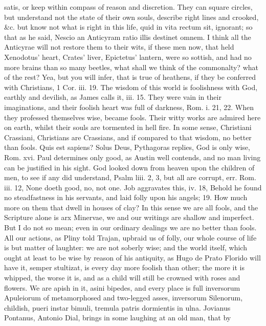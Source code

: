{satis, or keep within compass of reason and discretion. They can square
circles, but understand not the state of their own souls, describe
right lines and crooked, \&c. but know not what is right in this life,
quid in vita rectum sit, ignorant; so that as he said, Nescio an
Anticyram ratio illis destinet omnem. I think all the Anticyrae will
not restore them to their wits, if these men now, that held 
Xenodotus' heart, Crates' liver, Epictetus' lantern, were so sottish,
and had no more brains than so many beetles, what shall we think of the
commonalty? what of the rest?
Yea, but you will infer, that is true of heathens, if they be conferred
with Christians, 1 Cor. iii. 19. The wisdom of this world is
foolishness with God, earthly and devilish, as James calls it, iii. 15.
They were vain in their imaginations, and their foolish heart was full
of darkness, Rom. i. 21, 22. When they professed themselves wise,
became fools. Their witty works are admired here on earth, whilst their
souls are tormented in hell fire. In some sense, Christiani Crassiani,
Christians are Crassians, and if compared to that wisdom, no better
than fools. Quis est sapiens? Solus Deus, Pythagoras replies, God
is only wise, Rom. xvi. Paul determines only good, as Austin well
contends, and no man living can be justified in his sight. God looked
down from heaven upon the children of men, to see if any did
understand, Psalm liii. 2, 3, but all are corrupt, err. Rom. iii. 12,
None doeth good, no, not one. Job aggravates this, iv. 18, Behold he
found no steadfastness in his servants, and laid folly upon his angels;
19. How much more on them that dwell in houses of clay? In this sense
we are all fools, and the Scripture alone is arx Minervae, we and
our writings are shallow and imperfect. But I do not so mean; even in
our ordinary dealings we are no better than fools. All our actions, as
Pliny told Trajan, upbraid us of folly, our whole course of life
is but matter of laughter: we are not soberly wise; and the world
itself, which ought at least to be wise by reason of his antiquity, as
Hugo de Prato Florido will have it, semper stultizat, is every day
more foolish than other; the more it is whipped, the worse it is, and
as a child will still be crowned with roses and flowers. We are apish
in it, asini bipedes, and every place is full inversorum Apuleiorum of
metamorphosed and two-legged asses, inversorum Silenorum, childish,
pueri instar bimuli, tremula patris dormientis in ulna. Jovianus
Pontanus, Antonio Dial, brings in some laughing at an old man, that by
}
